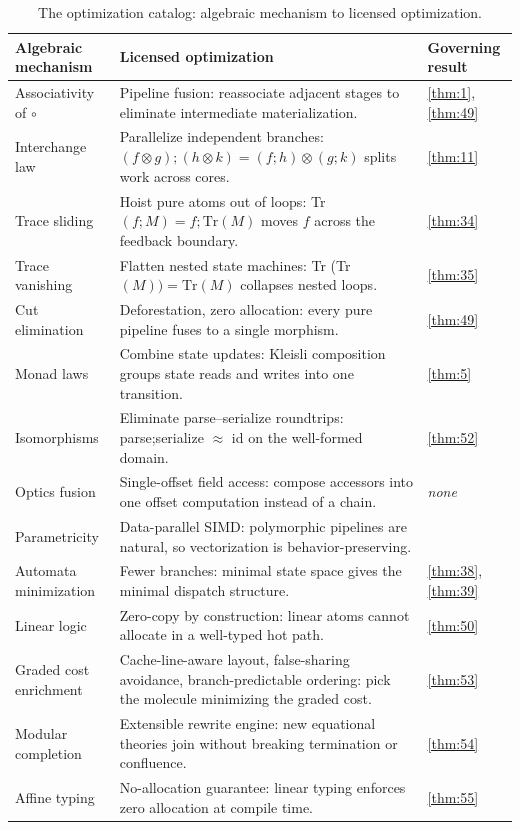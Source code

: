 \begin{table}[!htbp]
\centering
\caption{The optimization catalog: algebraic mechanism to licensed optimization.}
\label{tab:opt-catalog}
\small
\begin{tabular}{@{}p{3.9cm}p{4.6cm}l@{}}
\toprule
Algebraic mechanism & Licensed optimization & Governing result\\
\midrule
Associativity of $\circ$ & Pipeline fusion: reassociate adjacent stages to eliminate intermediate materialization. & \ref{thm:1}, \ref{thm:49}\\
Interchange law & Parallelize independent branches: $(f\otimes g);(h\otimes k) = (f;h)\otimes (g;k)$ splits work across cores. & \ref{thm:11}\\
Trace sliding & Hoist pure atoms out of loops: Tr$(f;M) = f;\mathrm{Tr} (M)$ moves $f$ across the feedback boundary. & \ref{thm:34}\\
Trace vanishing & Flatten nested state machines: Tr (Tr$(M)) = \mathrm{Tr} (M)$ collapses nested loops. & \ref{thm:35}\\
Cut elimination & Deforestation, zero allocation: every pure pipeline fuses to a single morphism. & \ref{thm:49}\\
Monad laws & Combine state updates: Kleisli composition groups state reads and writes into one transition. & \ref{thm:5}\\
Isomorphisms & Eliminate parse--serialize roundtrips: parse;serialize $\approx$ id on the well-formed domain. & \ref{thm:52}\\
Optics fusion & Single-offset field access: compose accessors into one offset computation instead of a chain. & \emph{none}\\
Parametricity & Data-parallel SIMD: polymorphic pipelines are natural, so vectorization is behavior-preserving. & \cite{wadler}\\
Automata minimization & Fewer branches: minimal state space gives the minimal dispatch structure. & \ref{thm:38}, \ref{thm:39}\\
Linear logic & Zero-copy by construction: linear atoms cannot allocate in a well-typed hot path. & \ref{thm:50}\\
Graded cost enrichment & Cache-line-aware layout, false-sharing avoidance, branch-predictable ordering: pick the molecule minimizing the graded cost. & \ref{thm:53}\\
Modular completion & Extensible rewrite engine: new equational theories join without breaking termination or confluence. & \ref{thm:54}\\
Affine typing & No-allocation guarantee: linear typing enforces zero allocation at compile time. & \ref{thm:55}\\
\bottomrule
\end{tabular}
\end{table}

